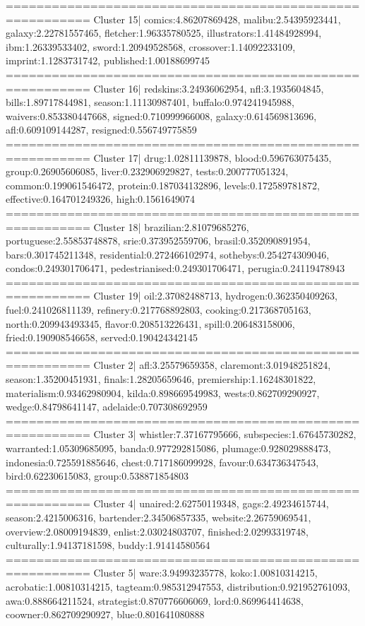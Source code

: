 ========================================================= 
Cluster 15| comics:4.86207869428, malibu:2.54395923441, galaxy:2.22781557465, fletcher:1.96335780525, illustrators:1.41484928994, ibm:1.26339533402, sword:1.20949528568, crossover:1.14092233109, imprint:1.1283731742, published:1.00188699745
========================================================= 
Cluster 16| redskins:3.24936062954, nfl:3.1935604845, bills:1.89717844981, season:1.11130987401, buffalo:0.974241945988, waivers:0.853380447668, signed:0.710999966008, galaxy:0.614569813696, afl:0.609109144287, resigned:0.556749775859
========================================================= 
Cluster 17| drug:1.02811139878, blood:0.596763075435, group:0.26905606085, liver:0.232906929827, tests:0.200777051324, common:0.199061546472, protein:0.187034132896, levels:0.172589781872, effective:0.164701249326, high:0.1561649074
========================================================= 
Cluster 18| brazilian:2.81079685276, portuguese:2.55853748878, srie:0.373952559706, brasil:0.352090891954, bars:0.301745211348, residential:0.272466102974, sothebys:0.254274309046, condos:0.249301706471, pedestrianised:0.249301706471, perugia:0.24119478943
========================================================= 
Cluster 19| oil:2.37082488713, hydrogen:0.362350409263, fuel:0.241026811139, refinery:0.217768892803, cooking:0.217368705163, north:0.209943493345, flavor:0.208513226431, spill:0.206483158006, fried:0.190908546658, served:0.190424342145
========================================================= 
Cluster 2| afl:3.25579659358, claremont:3.01948251824, season:1.35200451931, finals:1.28205659646, premiership:1.16248301822, materialism:0.93462980904, kilda:0.898669549983, wests:0.862709290927, wedge:0.84798641147, adelaide:0.707308692959
========================================================= 
Cluster 3| whistler:7.37167795666, subspecies:1.67645730282, warranted:1.05309685095, banda:0.977292815086, plumage:0.928029888473, indonesia:0.725591885646, chest:0.717186099928, favour:0.634736347543, bird:0.62230615083, group:0.538871854803
========================================================= 
Cluster 4| unaired:2.62750119348, gags:2.49234615744, season:2.4215006316, bartender:2.34506857335, website:2.26759069541, overview:2.08009194839, enlist:2.03024803707, finished:2.02993319748, culturally:1.94137181598, buddy:1.91414580564
========================================================= 
Cluster 5| ware:3.94993235778, koko:1.00810314215, acrobatic:1.00810314215, tagteam:0.985312947553, distribution:0.921952761093, awa:0.888664211524, strategist:0.870776606069, lord:0.869964414638, coowner:0.862709290927, blue:0.801641080888
